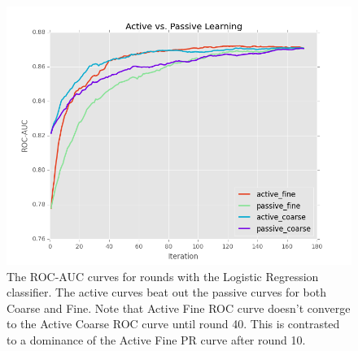 \documentclass[ms]{nuthesis}
\begin{document}
\FloatBarrier
\begin{figure}[!htb]
	\centering
    \includegraphics[width=1.0\columnwidth]{fig/runActPassLogReg_roc}
    \caption{The ROC-AUC curves for rounds with the
Logistic Regression classifier. The active curves beat out the passive
curves for both Coarse and Fine. Note that Active Fine ROC curve doesn't
converge to the Active Coarse ROC curve until round 40. This is contrasted
to a dominance of the Active Fine PR curve after round 10.}
\label{fig:runActPassLogReg_roc}
\end{figure}
\FloatBarrier
\end{document}
